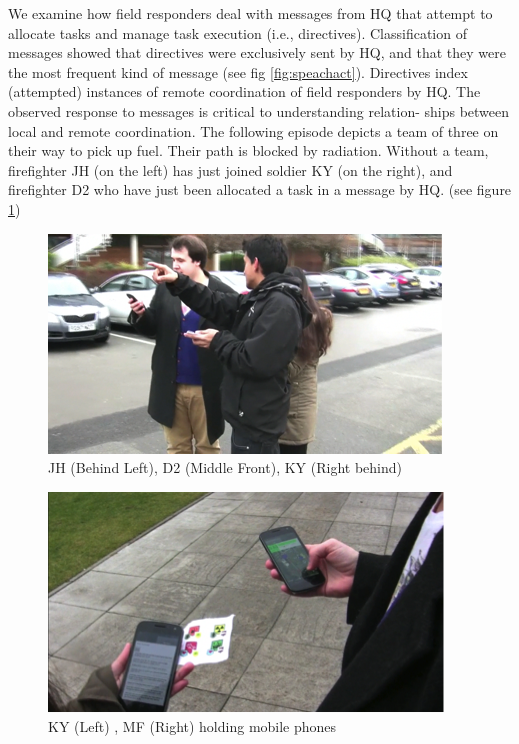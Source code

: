 We examine how field responders deal with messages from HQ that attempt to allocate tasks and manage task execution (i.e., directives). Classification of messages showed that directives were exclusively sent by HQ, and that they were the most frequent kind of message (see fig \ref{fig:speachact}). Directives index (attempted) instances of remote coordination of field responders by HQ. The observed response to messages is critical to understanding relation- ships between local and remote coordination. The following episode depicts a team of three on their way to pick up fuel. Their path is blocked by radiation. Without a team, firefighter JH (on the left) has just joined soldier KY (on the right), and firefighter D2 who have just been allocated a task in a message by HQ. (see figure \ref{fig:study1ep11})\\

\begin{figure}[h]
  \centering
  \includegraphics[width=.7\textwidth]{img/study1/ep1/ep11}
  \caption{JH (Behind Left), D2 (Middle Front), KY (Right behind)}
  \label{fig:study1ep11}
\end{figure}

\hfill \break
\noindent{}

\begin{figure}[h]
  \centering
  \includegraphics[width=.6\textwidth]{img/study1/ep1/ep12}
  \caption{KY (Left) , MF (Right) holding mobile phones}
  \label{fig:study1ep12}
\end{figure}


